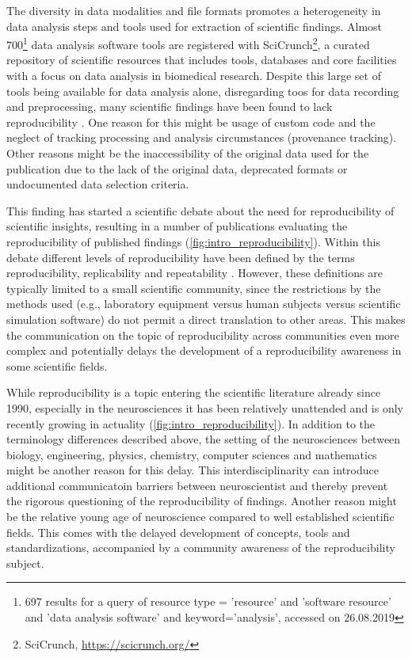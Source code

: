 The diversity in data modalities and file formats promotes a heterogeneity in data analysis steps and tools used for extraction of scientific findings. Almost 700\footnote{697 results for a query of resource type = 'resource' and 'software resource' and 'data analysis software' and keyword='analysis', accessed on 26.08.2019} data analysis software tools are registered with SciCrunch\footnote{SciCrunch, \url{https://scicrunch.org/}}, a curated repository of scientific resources that includes tools, databases and core facilities with a focus on data analysis in biomedical research. Despite this large set of tools being available for data analysis alone, disregarding toos for data recording and preprocessing, many scientific findings have been found to lack reproducibility \citep{Ioannidis_2005,Ioannidis_2007,Baker_2016,Eisner_2018}. One reason for this might be usage of custom code and the neglect of tracking processing and analysis circumstances (provenance tracking). Other reasons might be the inaccessibility of the original data used for the publication due to the lack of the original data, deprecated formats or undocumented data selection criteria.

This finding has started a scientific debate about the need for reproducibility of scientific insights, resulting in a number of publications evaluating the reproducibility of published findings (\cref{fig:intro_reproducibility}). Within this debate different levels of reproducibility have been defined by the terms reproducibility, replicability and repeatability \citep{Plesser_2018}. However, these definitions are typically limited to a small scientific community, since the restrictions by the methods used (e.g., laboratory equipment versus human subjects versus scientific simulation software) do not permit a direct translation to other areas. This makes the communication on the topic of reproducibility across communities even more complex and potentially delays the development of a reproducibility awareness in some scientific fields.

While reproducibility is a topic entering the scientific literature already since 1990, especially in the neurosciences it has been relatively unattended and is only recently growing in actuality (\cref{fig:intro_reproducibility}). In addition to the terminology differences described above, the setting of the neurosciences between biology, engineering, physics, chemistry, computer sciences and mathematics might be another reason for this delay. This interdisciplinarity can introduce additional communicatoin barriers between neuroscientist and thereby prevent the rigorous questioning of the reproducibility of findings. Another reason might be the relative young age of neuroscience compared to well established scientific fields. This comes with the delayed development of concepts, tools and standardizations, accompanied by a community awareness of the reproducibility subject.

